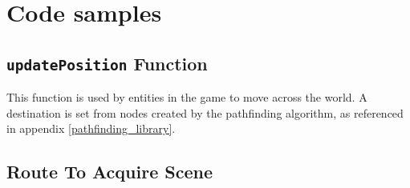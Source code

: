 \chapter{Code samples}

\section{\texttt{updatePosition} Function}\label{update_position}

This function is used by entities in the game to move across the world. A destination is set from nodes created by the pathfinding algorithm, as referenced in appendix \ref{pathfinding_library}.

\section{Route To Acquire Scene}\label{scene_route}